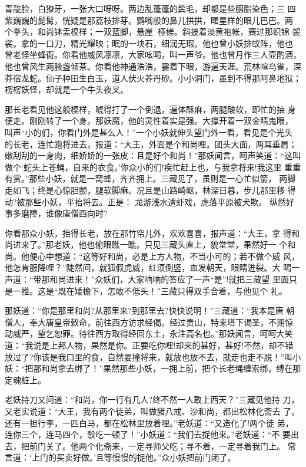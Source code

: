 青靛脸，白獠牙，一张大口呀呀。两边乱蓬蓬的鬓毛，却都是些胭脂染色；三
四紫巍巍的髭髯，恍疑是那荔枝排芽。鹦嘴般的鼻儿拱拱，曙星样的眼儿巴巴。两
个拳头，和尚钵盂模样；一双蓝脚，悬崖桠槎。斜披着淡黄袍帐，赛过那织锦
袈裟。拿的一口刀，精光耀映；眠的一块石，细润无瑕。他也曾小妖排蚁阵，他也
曾老怪坐蜂衙。你看他威风凛凛，大家吆喝，叫一声爷。他也曾月作三人壶酌酒，
他也曾风生两腋盏倾茶。你看他神通浩浩，霎着下眼，游遍天涯。荒林喧鸟雀，深
莽宿龙蛇。仙子种田生白玉，道人伏火养丹砂。小小洞门，虽到不得那阿鼻地狱；
楞楞妖怪，却就是一个牛头夜叉。

那长老看见他这般模样，唬得打了一个倒退，遍体酥麻，两腿酸软，即忙的抽
身便走。刚刚转了一个身，那妖魔，他的灵性着实是强。大撑开着一双金睛鬼眼，
叫声“小的们，你看门外是甚么人！”一个小妖就伸头望门外一看，看见是个光头
的长老，连忙跑将进去，报道：“大王，外面是个和尚哩。团头大面，两耳垂肩；
嫩刮刮的一身肉，细娇娇的一张皮：且是好个和尚！”那妖闻言，呵声笑道：“这叫
做个‘蛇头上苍蝇，自来的衣食。’你众小的们!疾忙赶上也，与我拿将来!我这里
重重有赏。”那些小妖，就是一窝蜂，齐齐拥上。三藏见了，虽则是一心忙似箭，
两脚走如飞；终是心惊胆颤，腿软脚麻。况且是山路崎岖，林深日暮，步儿那里移
得动?被那些小妖，平抬将去。正是：
龙游浅水遭虾戏，虎落平原被犬欺。
纵然好事多磨障，谁像唐僧西向时?

你看那众小妖，抬得长老，放在那竹帘儿外，欢欢喜喜，报声道：“大王，拿
得和尚进来了。”那老妖，他也偷眼瞧一瞧。只见三藏头直上，貌堂堂，果然好一
个和尚。他便心中想道：“这等好和尚，必是上方人物，不当小可的；若不做个威
风，他怎肯服降哩？”陡然间，就狐假虎威，红须倒竖，血发朝天，眼睛迸裂。大
喝一声道：“带那和尚进来！”众妖们，大家响响的答应了一声“是”!就把三藏望
里面只是一推。这是“既在矮檐下，怎敢不低头！”三藏只得双手合着，与他见个
礼。

那妖道：“你是那里和尚?从那里来?到那里去?快快说明！”三藏道：“我本是唐
朝僧人，奉大唐皇帝敕命，前往西方访求经偈。经过贵山，特来塔下谒圣，不期惊
动威严，望乞恕罪。待往西方取得经回东土，永注高名也。”那妖闻言，呵呵大笑
道：“我说是上邦人物，果然是你。正要吃你哩!却来的甚好，甚好!不然，却不错
放过了?你该是我口里的食，自然要撞将来，就放也放不去，就走也走不脱！”叫小
妖：“把那和尚拿去绑了！”果然那些小妖，一拥上前，把个长老绳缠索绑，缚在那
定魂桩上。

老妖持刀又问道：“和尚，你一行有几人?终不然一人敢上西天？”三藏见他持
刀，又老实说道：“大王，我有两个徒弟，叫做猪八戒、沙和尚，都出松林化斋去
了。还有一担行李，一匹白马，都在松林里放着哩。”老妖道：“又造化了!两个徒
弟，连你三个，连马四个，彀吃一顿了！”小妖道：“我们去捉他来。”老妖道：“不
要出去，把前门关了。他两个化斋来，一定寻师父吃；寻不着，一定寻着我门上。
常言道：‘上门的买卖好做。’且等慢慢的捉他。”众小妖把前门闭了。

